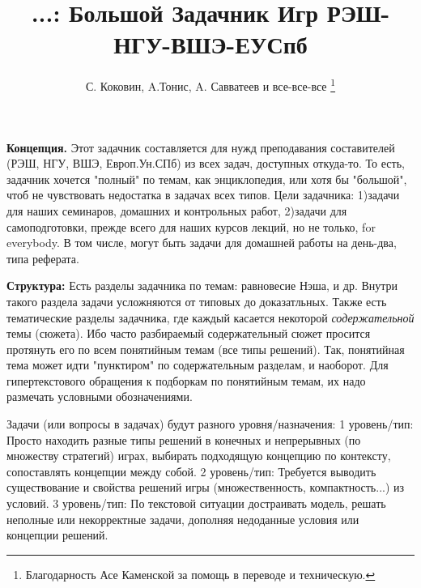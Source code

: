 \documentclass[a4paper,12pt]{article}
\begin{document}

\title{ ...: {\huge Большой Задачник Игр РЭШ-НГУ-ВШЭ-ЕУСпб}}
\author{С. Коковин, A.Тонис, A. Савватеев и все-все-все  \thanks{Благодарность
Асе Каменской за помощь в переводе и техническую.} }
\maketitle

{\bf Концепция.} Этот задачник составляется для
нужд преподавания составителей (РЭШ, НГУ, ВШЭ,
Европ.Ун.СПб) из всех задач, доступных откуда-то.
То есть, задачник хочется "полный" по темам, как
энциклопедия, или хотя бы "большой", чтоб не
чувствовать недостатка в задачах всех типов. Цели
задачника: 1)задачи для наших семинаров, домашних и
контрольных работ, 2)задачи для самоподготовки,
прежде всего для наших курсов лекций, но не только,
for everybody. В том числе, могут быть задачи для
домашней работы на день-два, типа реферата.\medskip

{\bf Структура:} Есть разделы задачника по темам:
равновесие Нэша, и др. Внутри такого раздела задачи
усложняются от типовых до доказатльных. Также есть
тематические разделы задачника, где каждый касается
некоторой {\em содержательной} темы (сюжета). Ибо
часто разбираемый содержательный сюжет просится
протянуть его по всем понятийным темам (все типы
решений). Так, понятийная тема может идти
"пунктиром" по содержательным разделам, и наоборот.
Для гипертекстового обращения к подборкам по
понятийным темам, их надо размечать условными
обозначениями.\medskip

Задачи (или вопросы в задачах) будут разного
уровня/назначения: 1 уровень/тип: Просто находить разные
типы решений в конечных и непрерывных (по множеству
стратегий) играх, выбирать подходящую концепцию по
контексту, сопоставлять концепции между собой. 2
уровень/тип: Требуется выводить существование и свойства
решений игры (множественность, компактность...) из условий.
3 уровень/тип: По текстовой ситуации достраивать модель,
решать неполные или некорректные задачи, дополняя
недоданные условия или концепции решений.\vspace{2mm}
\end{document}
